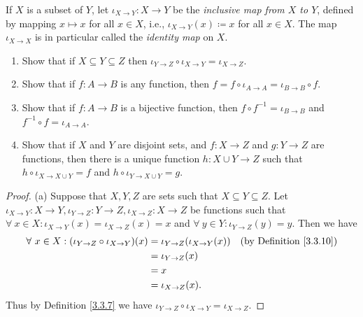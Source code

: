\begin{exercise}\label{ex 3.3.8}
    If \(X\) is a subset of \(Y\), let \(\iota_{X \to Y} : X \to Y\) be the \emph{inclusive map from \(X\) to \(Y\)}, defined by mapping \(x \mapsto x\) for all \(x \in X\), i.e., \(\iota_{X \to Y}(x) \coloneqq x\) for all \(x \in X\).
    The map \(\iota_{X \to X}\) is in particular called the \emph{identity map} on \(X\).
    \begin{enumerate}
        \item Show that if \(X \subseteq Y \subseteq Z\) then \(\iota_{Y \to Z} \circ \iota_{X \to Y} = \iota_{X \to Z}\).
        \item Show that if \(f : A \to B\) is any function, then \(f = f \circ \iota_{A \to A} = \iota_{B \to B} \circ f\).
        \item Show that if \(f : A \to B\) is a bijective function, then \(f \circ f^{-1} = \iota_{B \to B}\) and \(f^{-1} \circ f = \iota_{A \to A}\).
        \item Show that if \(X\) and \(Y\) are disjoint sets, and \(f : X \to Z\) and \(g : Y \to Z\) are functions, then there is a unique function \(h : X \cup Y \to Z\) such that \(h \circ \iota_{X \to X \cup Y} = f\) and \(h \circ \iota_{Y \to X \cup Y} = g\).
    \end{enumerate}
\end{exercise}

\begin{proof}{(a)}
    Suppose that \(X, Y, Z\) are sets such that \(X \subseteq Y \subseteq Z\).
    Let \(\iota_{X \to Y} : X \to Y, \iota_{Y \to Z} : Y \to Z, \iota_{X \to Z} : X \to Z\) be functions such that \(\forall\ x \in X : \iota_{X \to Y}(x) = \iota_{X \to Z}(x) = x\) and \(\forall\ y \in Y : \iota_{Y \to Z}(y) = y\).
    Then we have
    \begin{align*}
        \forall\ x \in X : (\iota_{Y \to Z} \circ \iota_{X \to Y})(x) & = \iota_{Y \to Z}(\iota_{X \to Y}(x)) & \text{(by Definition \ref{3.3.10})} \\
                                                                      & = \iota_{Y \to Z}(x)                                                        \\
                                                                      & = x                                                                         \\
                                                                      & = \iota_{X \to Z}(x).
    \end{align*}
    Thus by Definition \ref{3.3.7} we have \(\iota_{Y \to Z} \circ \iota_{X \to Y} = \iota_{X \to Z}\).
\end{proof}

